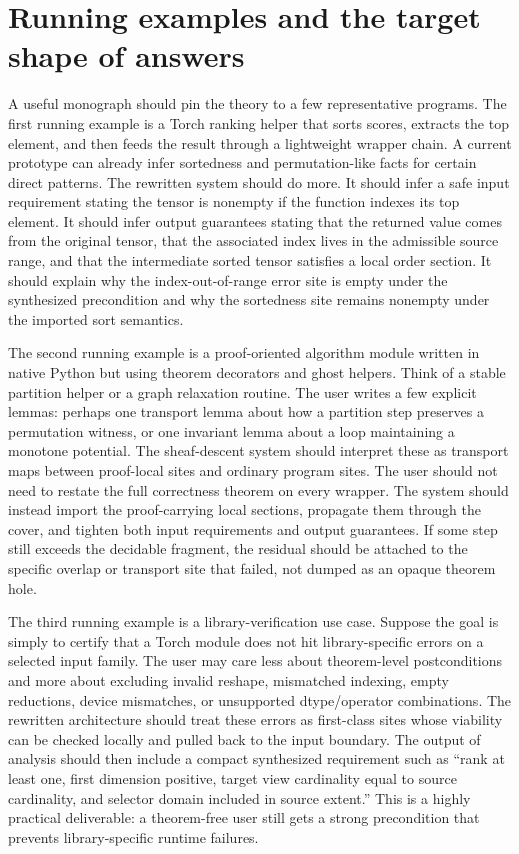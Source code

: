 \documentclass[11pt]{report}
\theoremstyle{definition}
\theoremstyle{plain}
\begin{document}
\section{Running examples and the target shape of answers}

A useful monograph should pin the theory to a few representative programs. The
first running example is a Torch ranking helper that sorts scores, extracts the
top element, and then feeds the result through a lightweight wrapper chain. A
current prototype can already infer sortedness and permutation-like facts for
certain direct patterns. The rewritten system should do more. It should infer a
safe input requirement stating the tensor is nonempty if the function indexes
its top element. It should infer output guarantees stating that the returned
value comes from the original tensor, that the associated index lives in the
admissible source range, and that the intermediate sorted tensor satisfies a
local order section. It should explain why the index-out-of-range error site is
empty under the synthesized precondition and why the sortedness site remains
nonempty under the imported sort semantics.

The second running example is a proof-oriented algorithm module written in
native Python but using theorem decorators and ghost helpers. Think of a stable
partition helper or a graph relaxation routine. The user writes a few explicit
lemmas: perhaps one transport lemma about how a partition step preserves a
permutation witness, or one invariant lemma about a loop maintaining a monotone
potential. The sheaf-descent system should interpret these as transport maps
between proof-local sites and ordinary program sites. The user should not need
to restate the full correctness theorem on every wrapper. The system should
instead import the proof-carrying local sections, propagate them through the
cover, and tighten both input requirements and output guarantees. If some step
still exceeds the decidable fragment, the residual should be attached to the
specific overlap or transport site that failed, not dumped as an opaque theorem
hole.

The third running example is a library-verification use case. Suppose the goal
is simply to certify that a Torch module does not hit library-specific errors on
a selected input family. The user may care less about theorem-level postconditions
and more about excluding invalid reshape, mismatched indexing, empty reductions,
device mismatches, or unsupported dtype/operator combinations. The rewritten
architecture should treat these errors as first-class sites whose viability can
be checked locally and pulled back to the input boundary. The output of analysis
should then include a compact synthesized requirement such as ``rank at least
one, first dimension positive, target view cardinality equal to source
cardinality, and selector domain included in source extent.'' This is a highly
practical deliverable: a theorem-free user still gets a strong precondition that
prevents library-specific runtime failures.
\end{document}
